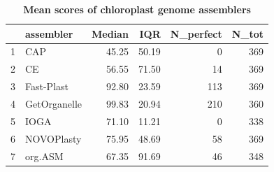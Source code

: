 \documentclass{bmcart}
\begin{document}
\begin{backmatter}
\begin{table}[h!]
\caption{\textbf{Mean scores of chloroplast genome assemblers}}
\label{tab:scores_real}
\centering
\begin{tabular}{rlrrrr}
  \hline
 & assembler & Median & IQR & N\_perfect & N\_tot \\ 
  \hline
1 & CAP & 45.25 & 50.19 &   0 & 369 \\ 
  2 & CE & 56.55 & 71.50 &  14 & 369 \\ 
  3 & Fast-Plast & 92.80 & 23.59 & 113 & 369 \\ 
  4 & GetOrganelle & 99.83 & 20.94 & 210 & 360 \\ 
  5 & IOGA & 71.10 & 11.21 &  0 & 338 \\ 
  6 & NOVOPlasty & 75.95 & 48.69 &  58 & 369 \\ 
  7 & org.ASM & 67.35 & 91.69 &  46 & 348 \\ 
   \hline
\end{tabular}
\end{table}


\end{backmatter}
\end{document}
